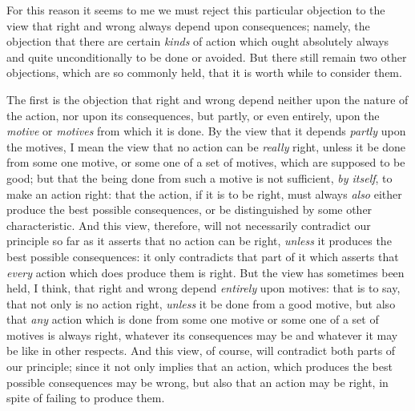 For this reason it seems to me we must reject this particular
objection to the view that right and wrong always depend upon
 consequences; namely, the objection that there are certain
\textit{kinds} of action which ought absolutely always and quite
unconditionally to be done or avoided. But there still remain two
other objections, which are so commonly held, that it is worth while
to consider them.

The first is the objection that right and wrong depend neither upon
the nature of the action, nor upon its consequences, but partly, or
even entirely, upon the \textit{motive} or \textit{motives} from which
it is done. By the view that it depends \textit{partly} upon the
motives, I mean the view that no action can be \textit{really} right,
unless it be done from some one motive, or some one of a set of
motives, which are supposed to be good; but that the being done from
such a motive is not sufficient, \textit{by itself}, to make an action
right: that the action, if it is to be right, must always
\textit{also} either produce the best possible consequences, or be
distinguished by some other characteristic. And this view, therefore,
will not necessarily contradict our principle so far as it asserts
that no action can be right, \textit{unless} it produces the best
possible consequences: it only contradicts that part of  it
which asserts that \textit{every} action which does produce them is
right. But the view has sometimes been held, I think, that right and
wrong depend \textit{entirely} upon motives: that is to say, that not
only is no action right, \textit{unless} it be done from a good
motive, but also that \textit{any} action which is done from some one
motive or some one of a set of motives is always right, whatever its
consequences may be and whatever it may be like in other respects. And
this view, of course, will contradict both parts of our principle;
since it not only implies that an action, which produces the best
possible consequences may be wrong, but also that an action may be
right, in spite of failing to produce them.

